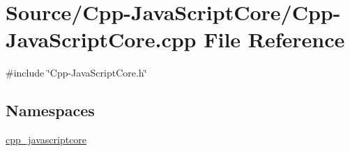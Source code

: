 \hypertarget{_cpp-_java_script_core_8cpp}{}\section{Source/\+Cpp-\/\+Java\+Script\+Core/\+Cpp-\/\+Java\+Script\+Core.cpp File Reference}
\label{_cpp-_java_script_core_8cpp}
{\ttfamily \#include \char`\"{}Cpp-\/\+Java\+Script\+Core.\+h\char`\"{}}\newline
\subsection*{Namespaces}
\begin{DoxyCompactItemize}
\item 
 \mbox{\hyperlink{namespacecpp__javascriptcore}{cpp\+\_\+javascriptcore}}
\end{DoxyCompactItemize}
